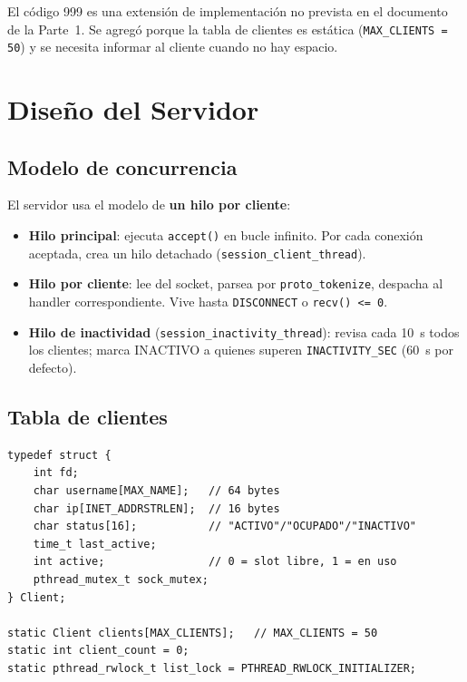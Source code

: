 \documentclass[12pt,a4paper]{article}
\begin{document}
El código 999 es una extensión de implementación no prevista en el documento de la
Parte~1.  Se agregó porque la tabla de clientes es estática (\texttt{MAX\_CLIENTS =
50}) y se necesita informar al cliente cuando no hay espacio.

\section{Diseño del Servidor}
\label{sec:servidor}

\subsection{Modelo de concurrencia}

El servidor usa el modelo de \textbf{un hilo por cliente}:

\begin{itemize}[nosep]
    \item \textbf{Hilo principal}: ejecuta \texttt{accept()} en bucle infinito.
          Por cada conexión aceptada, crea un hilo detachado
          (\texttt{session\_client\_thread}).
    \item \textbf{Hilo por cliente}: lee del socket, parsea por
          \texttt{proto\_tokenize}, despacha al handler correspondiente.
          Vive hasta \texttt{DISCONNECT} o \texttt{recv() <= 0}.
    \item \textbf{Hilo de inactividad} (\texttt{session\_inactivity\_thread}):
          revisa cada 10~s todos los clientes; marca INACTIVO a quienes superen
          \texttt{INACTIVITY\_SEC} (60~s por defecto).
\end{itemize}

\subsection{Tabla de clientes}

\begin{lstlisting}[caption={Estructura Client y tabla compartida (\texttt{server/session.c})}]
typedef struct {
    int fd;
    char username[MAX_NAME];   // 64 bytes
    char ip[INET_ADDRSTRLEN];  // 16 bytes
    char status[16];           // "ACTIVO"/"OCUPADO"/"INACTIVO"
    time_t last_active;
    int active;                // 0 = slot libre, 1 = en uso
    pthread_mutex_t sock_mutex;
} Client;

static Client clients[MAX_CLIENTS];   // MAX_CLIENTS = 50
static int client_count = 0;
static pthread_rwlock_t list_lock = PTHREAD_RWLOCK_INITIALIZER;
\end{lstlisting}
\end{document}
